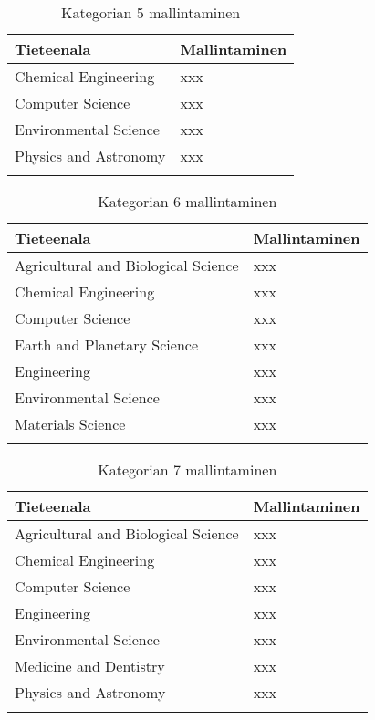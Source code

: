 \documentclass[utf8]{gradu3}
\begin{document}
\begin{longtable}[h]{|p{5cm}|p{8cm}|}
    \hline
    \textbf{Tieteenala}    &    \textbf{Mallintaminen}\\
    \hline
    Chemical Engineering & xxx \\
    \hline
    Computer Science & xxx \\
    \hline
    Environmental Science & xxx \\
    \hline
    Physics and Astronomy & xxx \\
    \hline
    \caption{Kategorian 5 mallintaminen}
    \label{table:Kategorian 5 mallintaminen}
\end{longtable}

\begin{longtable}[h]{|p{5cm}|p{8cm}|}
    \hline
    \textbf{Tieteenala}    &    \textbf{Mallintaminen}\\
    \hline
    Agricultural and Biological Science & xxx \\
    \hline
    Chemical Engineering & xxx \\
    \hline
    Computer Science & xxx \\
    \hline
    Earth and Planetary Science & xxx \\
    \hline
    Engineering & xxx \\
    \hline
    Environmental Science & xxx \\
    \hline
    Materials Science & xxx \\
    \hline
    \caption{Kategorian 6 mallintaminen}
    \label{table:Kategorian 6 mallintaminen}
\end{longtable}

\begin{longtable}[h]{|p{5cm}|p{8cm}|}
    \hline
    \textbf{Tieteenala}    &    \textbf{Mallintaminen}\\
    \hline
    Agricultural and Biological Science & xxx \\
    \hline
    Chemical Engineering & xxx \\
    \hline
    Computer Science & xxx \\
    \hline
    Engineering & xxx \\
    \hline
    Environmental Science & xxx \\
    \hline
    Medicine and Dentistry & xxx \\
    \hline
    Physics and Astronomy & xxx \\
    \hline
    \caption{Kategorian 7 mallintaminen}
    \label{table:Kategorian 7 mallintaminen}
\end{longtable}
\end{document}
